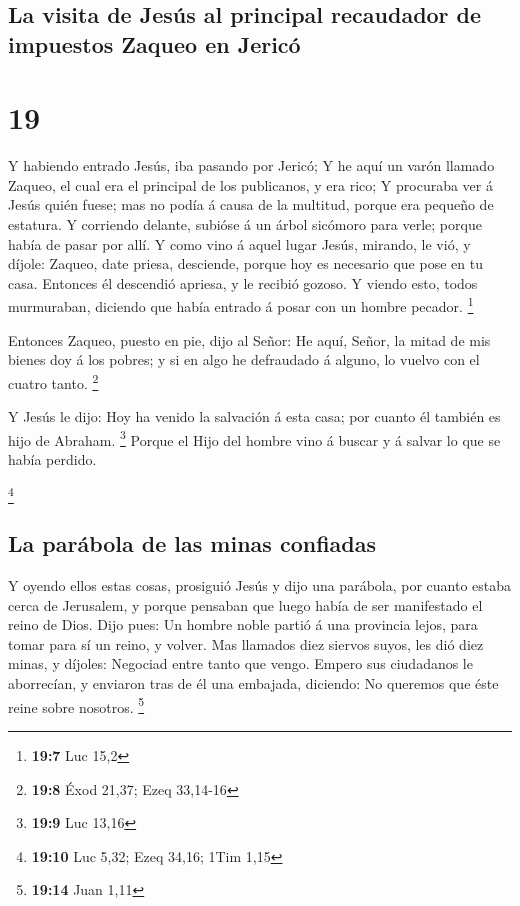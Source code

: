 \hypertarget{la-visita-de-jesuxfas-al-principal-recaudador-de-impuestos-zaqueo-en-jericuxf3}{%
\subsection{La visita de Jesús al principal recaudador de impuestos
Zaqueo en
Jericó}\label{la-visita-de-jesuxfas-al-principal-recaudador-de-impuestos-zaqueo-en-jericuxf3}}

\hypertarget{section-18}{%
\section{19}\label{section-18}}

 Y habiendo entrado Jesús, iba pasando por Jericó;
 Y he aquí un varón llamado Zaqueo, el cual era el principal
de los publicanos, y era rico;  Y procuraba ver á Jesús
quién fuese; mas no podía á causa de la multitud, porque era pequeño de
estatura.  Y corriendo delante, subióse á un árbol sicómoro
para verle; porque había de pasar por allí.  Y como vino á
aquel lugar Jesús, mirando, le vió, y díjole: Zaqueo, date priesa,
desciende, porque hoy es necesario que pose en tu casa. 
Entonces él descendió apriesa, y le recibió gozoso.  Y
viendo esto, todos murmuraban, diciendo que había entrado á posar con un
hombre pecador. \footnote{\textbf{19:7} Luc 15,2}

 Entonces Zaqueo, puesto en pie, dijo al Señor: He aquí,
Señor, la mitad de mis bienes doy á los pobres; y si en algo he
defraudado á alguno, lo vuelvo con el cuatro tanto. \footnote{\textbf{19:8}
  Éxod 21,37; Ezeq 33,14-16}

 Y Jesús le dijo: Hoy ha venido la salvación á esta casa;
por cuanto él también es hijo de Abraham. \footnote{\textbf{19:9} Luc
  13,16}  Porque el Hijo del hombre vino á buscar y á
salvar lo que se había perdido.

\footnote{\textbf{19:10} Luc 5,32; Ezeq 34,16; 1Tim 1,15}

\hypertarget{la-paruxe1bola-de-las-minas-confiadas}{%
\subsection{La parábola de las minas
confiadas}\label{la-paruxe1bola-de-las-minas-confiadas}}

 Y oyendo ellos estas cosas, prosiguió Jesús y dijo una
parábola, por cuanto estaba cerca de Jerusalem, y porque pensaban que
luego había de ser manifestado el reino de Dios.  Dijo
pues: Un hombre noble partió á una provincia lejos, para tomar para sí
un reino, y volver.  Mas llamados diez siervos suyos, les
dió diez minas, y díjoles: Negociad entre tanto que vengo. 
Empero sus ciudadanos le aborrecían, y enviaron tras de él una embajada,
diciendo: No queremos que éste reine sobre nosotros. \footnote{\textbf{19:14}
  Juan 1,11}

